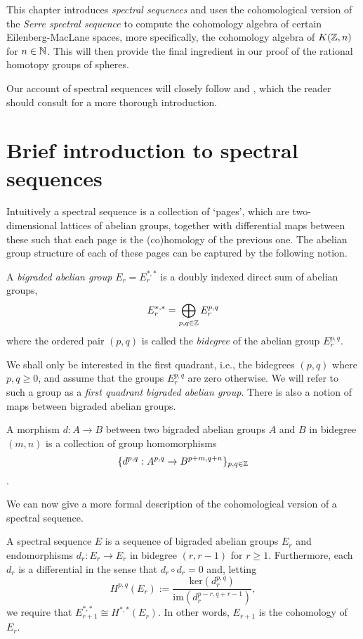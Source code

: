 \documentclass[../main.tex]{subfiles}
\begin{document}
This chapter introduces \emph{spectral sequences}
and uses the cohomological version of the \emph{Serre spectral sequence} to 
compute the cohomology algebra of certain Eilenberg-MacLane spaces, more
specifically, the cohomology algebra of \( K(\mathbb{Z}, n) \) for \( n \in \mathbb{N} \). This
will then provide the final ingredient in our
proof of the rational homotopy groups of spheres.

Our account of spectral sequences will closely follow 
\cite[]{Le00} and \cite[]{Ramos}, which the reader should consult for a more thorough
introduction.
\section{Brief introduction to spectral sequences}
Intuitively a spectral sequence is a collection of `pages', which
are two-dimensional lattices of abelian groups, together with
differential maps between these such that each page is the (co)homology
of the previous one. The abelian group structure of each of these pages
can be captured by the following notion.
\begin{definition}
    A \emph{bigraded abelian group} \( E_r=E_r^{*, *} \) is a doubly
    indexed direct sum of abelian groups,
    \begin{equation}
        E_r^{*, *} = \bigoplus_{p,q\in\mathbb{Z}} E_r^{p, q}
    \end{equation}
    where the ordered pair \( (p, q) \) is called the \emph{bidegree} of
    the abelian group \( E_r^{p, q} \).
\end{definition}
We shall only be interested in the first quadrant,
i.e., the bidegrees \( (p, q) \) where \( p,q\geq 0 \), and assume
that the groups \( E_r^{p,q} \) are zero otherwise. We will refer to
such a group as a \emph{first quadrant bigraded abelian group}. There
is also a notion of maps between bigraded abelian groups.
\begin{definition}[]
    A morphism \( d:A\rightarrow B \) between two bigraded abelian groups
    \( A \) and \( B \) in bidegree \( (m,n) \) is a collection of
    group homomorphisms \[ \{d^{p, q}:A^{p, q}\rightarrow B^{p+m, q+n}\}_{p,q\in\mathbb{Z}} \].
\end{definition}
We can now give a more formal description of the cohomological version of a spectral sequence.
\begin{definition}
    A spectral sequence \( E \) is a sequence of bigraded abelian groups
    \( E_r \) and endomorphisms \( d_r:E_r\rightarrow E_r \) in bidegree
    \( (r, r-1) \) for \( r\geq 1 \). Furthermore, each \( d_r \) is
    a differential in the sense that \( d_r\circ d_r =0 \) and, letting
   \begin{equation}
       H^{p,q}(E_r) := \frac{\text{ker}(d^{p,q}_r)}{\text{im}(d^{p-r,q+r-1}_r)},
   \end{equation} 
    we require that \( E_{r+1}^{*,*}\cong H^{*, *}(E_r) \). In other
    words, \( E_{r+1} \) is the cohomology of \( E_r \). 
\end{definition}
\end{document}
